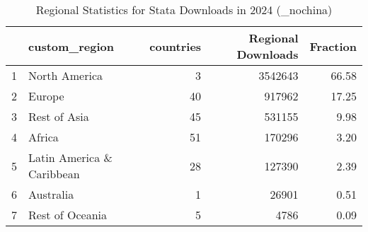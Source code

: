 \begin{table}[ht]
\centering
\begin{tabular}{rlrrr}
  \hline
 & custom\_region & countries & Regional Downloads & Fraction \\ 
  \hline
1 & North America &   3 & 3542643 & 66.58 \\ 
  2 & Europe &  40 & 917962 & 17.25 \\ 
  3 & Rest of Asia &  45 & 531155 & 9.98 \\ 
  4 & Africa &  51 & 170296 & 3.20 \\ 
  5 & Latin America \& Caribbean &  28 & 127390 & 2.39 \\ 
  6 & Australia &   1 & 26901 & 0.51 \\ 
  7 & Rest of Oceania &   5 & 4786 & 0.09 \\ 
   \hline
\end{tabular}
\caption{Regional Statistics for Stata Downloads in 2024 (_nochina)} 
\label{tab:stata_downloads_regional_stats_2024_nochina}
\end{table}
